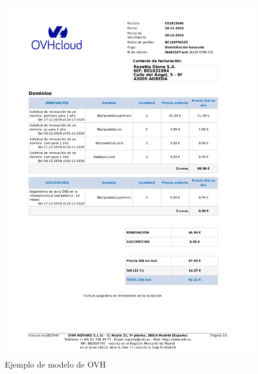 \begin{figure}[hp!]
	\centering
	\includegraphics[angle=0,height=1.4\textwidth]{imaxes/z-adicional/modelo-ovh}
	\caption{Ejemplo de modelo de OVH}
	\label{fig:modelo-ovh}
\end{figure}

